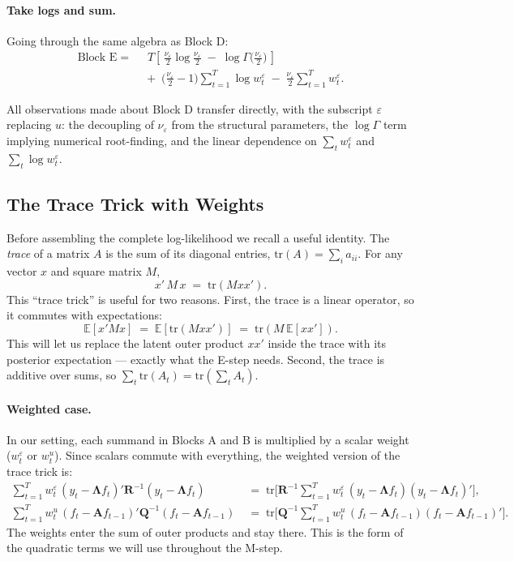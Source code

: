 \documentclass[11pt, a4paper, oneside]{article}
\newcommand{\mL}{\boldsymbol{\Lambda}}
\newcommand{\mA}{\mathbf{A}}
\newcommand{\mR}{\mathbf{R}}
\newcommand{\mQ}{\mathbf{Q}}
\begin{document}
\paragraph{Take logs and sum.}
Going through the same algebra as Block D:
\begin{equation}
\boxed{\,
\begin{aligned}
\text{Block E} \;=\;
& \;\; T \left[\, \tfrac{\nu_\varepsilon}{2}\log\!\tfrac{\nu_\varepsilon}{2}
            \;-\; \log \Gamma\!\big(\tfrac{\nu_\varepsilon}{2}\big)\,\right] \\[3pt]
& \;+\; \big(\tfrac{\nu_\varepsilon}{2} - 1\big)\sum_{t=1}^{T}\log w^\varepsilon_t
\;-\; \tfrac{\nu_\varepsilon}{2}\sum_{t=1}^{T} w^\varepsilon_t.
\end{aligned}
\,}
\label{eq:block-E}
\end{equation}

All observations made about Block D transfer directly, with the
subscript $\varepsilon$ replacing $u$: the decoupling of
$\nu_\varepsilon$ from the structural parameters, the $\log \Gamma$
term implying numerical root-finding, and the linear dependence on
$\sum_t w^\varepsilon_t$ and $\sum_t \log w^\varepsilon_t$.

\subsection{The Trace Trick with Weights}

Before assembling the complete log-likelihood we recall a useful
identity. The \emph{trace} of a matrix $A$ is the sum of its diagonal
entries, $\mathrm{tr}(A) = \sum_i a_{ii}$. For any vector $x$ and
square matrix $M$,
\[
x'\, M\, x \;=\; \mathrm{tr}(M x x').
\]
This ``trace trick'' is useful for two reasons. First, the trace is a
linear operator, so it commutes with expectations:
\[
\mathbb{E}[x'M x] \;=\; \mathbb{E}[\mathrm{tr}(M x x')] \;=\; \mathrm{tr}(M\, \mathbb{E}[x x']).
\]
This will let us replace the latent outer product $xx'$ inside the
trace with its posterior expectation — exactly what the E-step needs.
Second, the trace is additive over sums, so
$\sum_t \mathrm{tr}(A_t) = \mathrm{tr}(\sum_t A_t)$.

\paragraph{Weighted case.}
In our setting, each summand in Blocks A and B is multiplied by a
scalar weight ($w^\varepsilon_t$ or $w^u_t$). Since scalars commute
with everything, the weighted version of the trace trick is:
\begin{align*}
\sum_{t=1}^{T} w^\varepsilon_t\, (y_t - \mL f_t)' \mR^{-1} (y_t - \mL f_t)
&\;=\; \mathrm{tr}\!\Bigg[\mR^{-1} \sum_{t=1}^{T} w^\varepsilon_t\, (y_t - \mL f_t)(y_t - \mL f_t)'\Bigg], \\[4pt]
\sum_{t=1}^{T} w^u_t\, (f_t - \mA f_{t-1})' \mQ^{-1} (f_t - \mA f_{t-1})
&\;=\; \mathrm{tr}\!\Bigg[\mQ^{-1} \sum_{t=1}^{T} w^u_t\, (f_t - \mA f_{t-1})(f_t - \mA f_{t-1})'\Bigg].
\end{align*}
The weights enter the sum of outer products and stay there. This is
the form of the quadratic terms we will use throughout the M-step.
\end{document}
